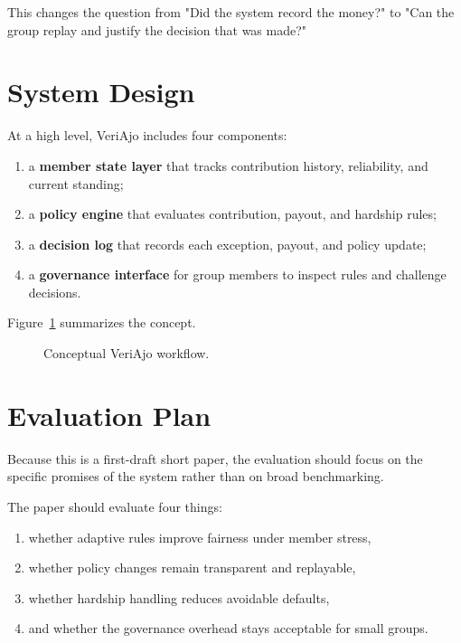 \documentclass[10pt, conference]{IEEEtran}
\begin{document}
This changes the question from "Did the system record the money?" to "Can the group replay and justify the decision that was made?"

\section{System Design}
At a high level, VeriAjo includes four components:
\begin{enumerate}
    \item a \textbf{member state layer} that tracks contribution history, reliability, and current standing;
    \item a \textbf{policy engine} that evaluates contribution, payout, and hardship rules;
    \item a \textbf{decision log} that records each exception, payout, and policy update;
    \item a \textbf{governance interface} for group members to inspect rules and challenge decisions.
\end{enumerate}

Figure~\ref{fig:system} summarizes the concept.

\begin{figure}[t]
\centering
{}
\caption{Conceptual VeriAjo workflow.}
\label{fig:system}
\end{figure}

\section{Evaluation Plan}
Because this is a first-draft short paper, the evaluation should focus on the specific promises of the system rather than on broad benchmarking.

The paper should evaluate four things:
\begin{enumerate}
    \item whether adaptive rules improve fairness under member stress,
    \item whether policy changes remain transparent and replayable,
    \item whether hardship handling reduces avoidable defaults,
    \item and whether the governance overhead stays acceptable for small groups.
\end{enumerate}
\end{document}
